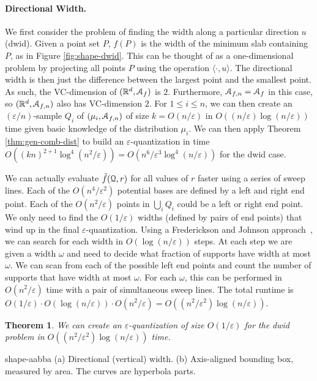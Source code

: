 \documentclass{journal}
\newcommand{\eps}{\varepsilon}
\newcommand{\Eu}[1]{\ensuremath{\EuScript{#1}}}
\newcommand{\R}{\ensuremath{\mathbb{R}}}
\newcommand{\IP}[2]{\ensuremath{ \langle #1 , #2 \rangle}}
\newcommand{\psets}{supports\xspace}
\newtheorem {theorem}{Theorem}[section]
\begin{document}
\paragraph{Directional Width.}
We first consider the problem of finding the width along a particular direction $u$ (\textsf{dwid}).  Given a point set $P$, $f(P)$ is the width of the minimum slab containing $P$, as in Figure \ref{fig:shape-dwid}.    This can be thought of as a one-dimensional problem by projecting all points $P$ using the operation $\IP{\cdot}{u}$.  The directional width is then just the difference between the largest point and the smallest point.  As such, the VC-dimension of $(\R^d, \Eu A_f)$ is $2$.  Furthermore, $\Eu{A}_{f,n} = \Eu A_f$ in this case, so $(\R^d, \Eu{A}_{f,n})$ also has VC-dimension $2$.  For $1 \leq i \leq n$, we can then create an $(\eps/n)$-sample $Q_i$ of $(\mu_i, \Eu{A}_{f,n})$ of size $k = O(n/\eps)$ in $O((n/\eps) \log (n/\eps))$ time given basic knowledge of the distribution $\mu_i$.
We can then apply Theorem \ref{thm:gen-comb-dist} to build an $\eps$-quantization in time $O((kn)^{2+1}\log^4(n^2/\eps)) = O(n^6/\eps^3 \log^4 (n/\eps))$ for the \textsf{dwid} case.

We can actually evaluate $\tilde f (\Eu Q, r)$ for all values of $r$ faster using a series of sweep lines.  Each of the $O(n^4/\eps^2)$ potential bases are defined by a left and right end point.  Each of the $O(n^2/\eps)$ points in $\bigcup_i Q_i$ could be a left or right end point.
We only need to find the $O(1/\eps)$ widths (defined by pairs of end points) that wind up in the final $\eps$-quantization.
Using a Frederickson and Johnson approach~\cite{FJ84}, we can search for each width in $O(\log (n/\eps))$ steps.  At each step we are given a width $\omega$ and need to decide what fraction of \psets have width at most $\omega$.  We can scan from each of the possible left end points and count the number of \psets that have width at most $\omega$.  For each $\omega$, this can be performed in $O(n^2/\eps)$ time with a pair of simultaneous sweep lines.
The total runtime is $O(1/\eps) \cdot O(\log (n/\eps)) \cdot O(n^2/\eps) = O((n^2/\eps^2) \log (n/\eps))$.

\begin{theorem}
We can create an $\eps$-quantization of size $O(1/\eps)$ for the \textsf{dwid} problem in $O((n^2/\eps^2) \log (n/\eps))$ time.
\end{theorem}

 {shape-aabba}
{(a) Directional (vertical) width. (b) Axis-aligned bounding box, measured by area. The curves are hyperbola parts.}
\end{document}
